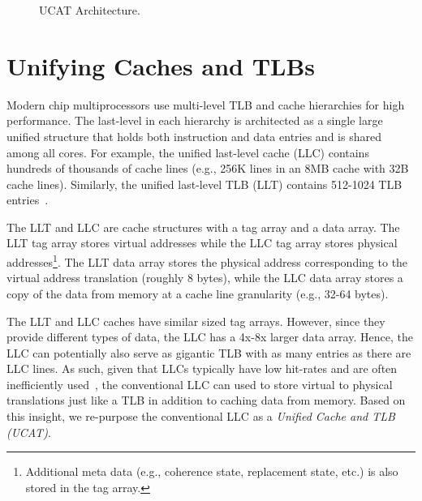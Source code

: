 \begin{figure*}[tbh] 
\vspace{-0. in}
\centering
\centerline{}
\caption{\small UCAT Architecture. \normalsize}
\label{fig:UCAT} 
\vspace{-0.0in}
\end{figure*}

\section{Unifying Caches and TLBs}
\label{sec:UCAT}

\noindent Modern chip multiprocessors use multi-level TLB and cache
hierarchies for high performance. The last-level in each hierarchy is
architected as a single large unified structure that holds both
instruction and data entries and is shared among all cores. For
example, the unified last-level cache (LLC) contains hundreds of
thousands of cache lines (e.g., 256K lines in an 8MB cache with 32B
cache lines). Similarly, the unified last-level TLB (LLT) contains
512-1024 TLB entries~\cite{sodani2016knights,ia_manual}.


The LLT and LLC are cache structures with a tag array and a data
array. The LLT tag array stores virtual addresses while the LLC tag
array stores physical addresses\footnote{Additional meta data (e.g.,
coherence state, replacement state, etc.) is also stored in the tag
array.}. The LLT data array stores the physical address corresponding
to the virtual address translation (roughly 8 bytes), while the LLC
data array stores a copy of the data from memory at a cache line
granularity (e.g., 32-64 bytes).



The LLT and LLC caches have similar sized tag arrays. However, since
they provide different types of data, the LLC has a 4x-8x larger data
array. Hence, the LLC can potentially also serve as gigantic TLB with
as many entries as there are LLC lines. As such, given that LLCs
typically have low hit-rates and are often inefficiently
used~\cite{jaleel_rrip,setdueling,wu2011,jimenez_micro2013,khan2010},
the conventional LLC can used to store virtual to physical
translations just like a TLB in addition to caching data from memory.
Based on this insight, we re-purpose the conventional LLC as a {\em
Unified Cache and TLB (UCAT)}.

